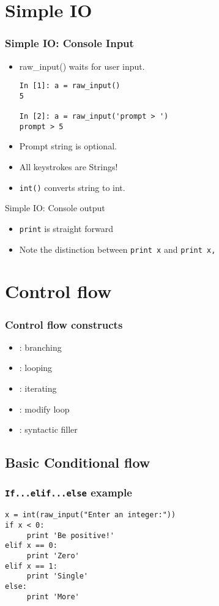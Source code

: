\documentclass[14pt,compress]{beamer}
\newcounter{time}
\newcommand{\inctime}[1]{\addtocounter{time}{#1}{\tiny \thetime\ m}}
\newcommand{\typ}[1]{\texttt{#1}}
\newcommand{\kwrd}[1]{ \texttt{\textbf{\color{blue}{#1}}}  }
\begin{document}
\section{Simple IO}
\begin{frame}[fragile]
  \frametitle{Simple IO: Console Input}
  \begin{itemize}
    \item raw\_input() waits for user input.
      \begin{lstlisting}
In [1]: a = raw_input()
5

In [2]: a = raw_input('prompt > ')
prompt > 5
      \end{lstlisting}
    \item Prompt string is optional.
    \item All keystrokes are Strings!
    \item \texttt{int()} converts string to int.
  \end{itemize}
\end{frame}

\begin{frame}{Simple IO: Console output}
  \begin{itemize}
    \item \texttt{print} is straight forward
    \item Note the distinction between \texttt{print x} and \texttt{print x,}
  \end{itemize}
\end{frame}

\section{Control flow}
\begin{frame}
  \frametitle{Control flow constructs}  
  \begin{itemize}
  \item \kwrd{if/elif/else}: branching
  \item \kwrd{while}: looping
  \item \kwrd{for}: iterating 
  \item \kwrd{break, continue}: modify loop 
  \item \kwrd{pass}: syntactic filler
  \end{itemize}
\end{frame}

\subsection{Basic Conditional flow}
\begin{frame}[fragile]
  \frametitle{\typ{If...elif...else} example}
  \begin{lstlisting}
x = int(raw_input("Enter an integer:"))
if x < 0:
     print 'Be positive!'
elif x == 0:
     print 'Zero'
elif x == 1:
     print 'Single'
else:
     print 'More'
  \end{lstlisting}
  \inctime{10}
\end{frame}
\end{document}
